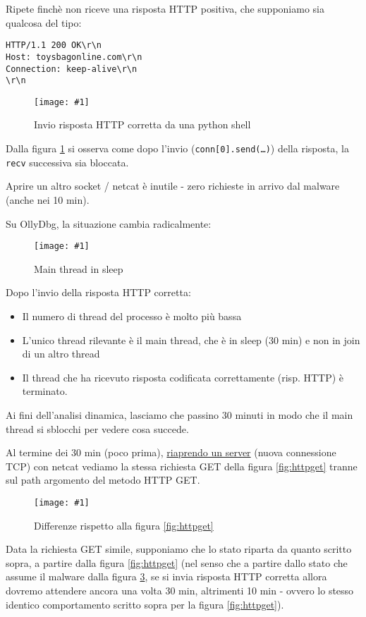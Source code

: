 \documentclass[
    a4paper, %
    11pt %
]{article}
\newcommand{\pic}[4]{\begin{figure}[H]
            \centering
            \texttt{[image: \#1]}
            \caption{#2}
            \label{fig:#1}
            \end{figure}}
\begin{document}
            Ripete finchè non riceve una risposta HTTP positiva, che supponiamo sia qualcosa del tipo:

            \begin{lstlisting}
HTTP/1.1 200 OK\r\n
Host: toysbagonline.com\r\n
Connection: keep-alive\r\n
\r\n
            \end{lstlisting}

            \pic{pyhttpans}{Invio risposta HTTP corretta da una python shell}{19cm}{10cm}

            Dalla figura \ref{fig:pyhttpans} si osserva come dopo l'invio (\texttt{conn[0].send(\dots)}) della
            risposta, la \texttt{recv} successiva sia bloccata.

            Aprire un altro socket / netcat è inutile - zero richieste in arrivo dal malware (anche nei 10 min).

            Su OllyDbg, la situazione cambia radicalmente:

            \pic{pyhttpans_mainthr_callstack}{Main thread in sleep}{17cm}{7cm}

            Dopo l'invio della risposta HTTP corretta:
            \begin{itemize}
                \item Il numero di thread del processo è molto più bassa
                \item L'unico thread rilevante è il main thread, che è in sleep (30 min) e non in join di un
                    altro thread
                \item Il thread che ha ricevuto risposta codificata correttamente (risp. HTTP) è terminato.
            \end{itemize}

            Ai fini dell'analisi dinamica, lasciamo che passino 30 minuti in modo che il main thread si sblocchi
            per vedere cosa succede.

            Al termine dei 30 min (poco prima), \underline{riaprendo un server} (nuova connessione TCP) con netcat vediamo la stessa richiesta GET della figura
            \ref{fig:httpget} tranne sul path argomento del metodo HTTP GET.

            \pic{httpget_after}{Differenze rispetto alla figura \ref{fig:httpget}}{19cm}{5.5cm}

            Data la richiesta GET simile, supponiamo che lo stato riparta da quanto scritto sopra, a partire
            dalla figura \ref{fig:httpget} (nel senso che a partire dallo stato che assume il malware 
            dalla figura \ref{fig:httpget_after}, se si invia risposta HTTP corretta allora dovremo attendere ancora una volta 30 min, altrimenti 10 min - ovvero lo stesso identico comportamento scritto sopra per la figura \ref{fig:httpget}).
            
\end{document}
